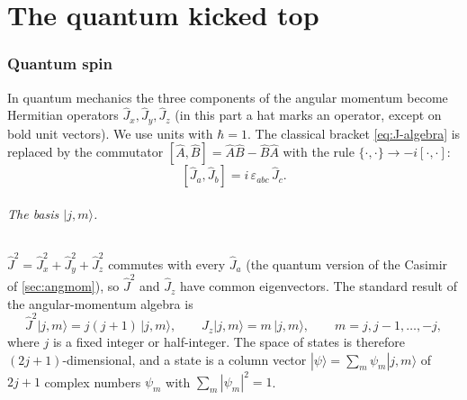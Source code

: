 \documentclass[11pt,a4paper]{article}
\newcommand{\PB}[2]{\{#1,#2\}}
\begin{document}
\part{The quantum kicked top}\label{part:quantum}

\section{Quantum spin}\label{sec:quantum}

In quantum mechanics the three components of the angular momentum become Hermitian operators $\hat J_x, \hat J_y,
\hat J_z$ (in this part a hat marks an operator, except on bold unit vectors). We use units with $\hbar = 1$. The
classical bracket \eqref{eq:J-algebra} is replaced by the commutator $[\hat A, \hat B] = \hat A\hat B - \hat B\hat A$
with the rule $\PB{\cdot}{\cdot} \to -i[\cdot,\cdot]$:
\begin{equation}\label{eq:q-algebra}
  [\hat J_a, \hat J_b] = i\,\varepsilon_{abc}\,\hat J_c .
\end{equation}

\paragraph{The basis $|j,m\rangle$.} $\hat J^2 = \hat J_x^2 + \hat J_y^2 + \hat J_z^2$ commutes with every $\hat J_a$
(the quantum version of the Casimir of \cref{sec:angmom}), so $\hat J^2$ and $\hat J_z$ have common eigenvectors.
The standard result of the angular-momentum algebra is
\begin{equation}\label{eq:jm-basis}
  \hat J^2|j,m\rangle = j(j+1)\,|j,m\rangle, \qquad \hat J_z|j,m\rangle = m\,|j,m\rangle, \qquad
  m = j, j-1, \dots, -j,
\end{equation}
where $j$ is a fixed integer or half-integer. The space of states is therefore $(2j+1)$-dimensional, and a state is a
column vector $|\psi\rangle = \sum_m \psi_m|j,m\rangle$ of $2j+1$ complex numbers $\psi_m$ with $\sum_m|\psi_m|^2 = 1$.
\end{document}
